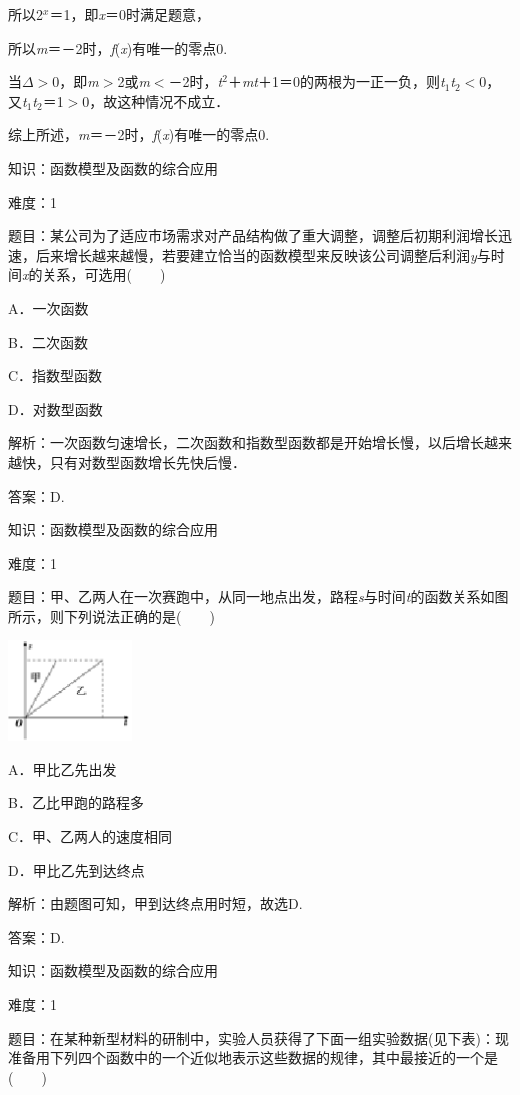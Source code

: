 \documentclass{article} %
\begin{document}
所以2\textit{${}^{x}$}＝1，即\textit{x}＝0时满足题意，

所以\textit{m}＝－2时，\textit{f}(\textit{x})有唯一的零点0.

当$\Delta$$\mathrm{>}$0，即\textit{m}$\mathrm{>}$2或\textit{m}$\mathrm{<}$－2时，\textit{t}${}^{2}$＋\textit{mt}＋1＝0的两根为一正一负，则\textit{t}${}_{1}$\textit{t}${}_{2}$$\mathrm{<}$0，又\textit{t}${}_{1}$\textit{t}${}_{2}$＝1$\mathrm{>}$0，故这种情况不成立．

综上所述，\textit{m}＝－2时，\textit{f}(\textit{x})有唯一的零点0.

知识：函数模型及函数的综合应用

难度：1

题目：某公司为了适应市场需求对产品结构做了重大调整，调整后初期利润增长迅速，后来增长越来越慢，若要建立恰当的函数模型来反映该公司调整后利润\textit{y}与时间\textit{x}的关系，可选用(　　)

A．一次函数　　　　 

B．二次函数

C．指数型函数   

D．对数型函数

解析：一次函数匀速增长，二次函数和指数型函数都是开始增长慢，以后增长越来越快，只有对数型函数增长先快后慢．

答案：D.

知识：函数模型及函数的综合应用

难度：1

题目：甲、乙两人在一次赛跑中，从同一地点出发，路程\textit{s}与时间\textit{t}的函数关系如图所示，则下列说法正确的是(　　)

\includegraphics*[width=1.29in, height=1.05in, keepaspectratio=false]{image74}

A．甲比乙先出发

B．乙比甲跑的路程多

C．甲、乙两人的速度相同

D．甲比乙先到达终点

解析：由题图可知，甲到达终点用时短，故选D.

答案：D.

知识：函数模型及函数的综合应用

难度：1

题目：在某种新型材料的研制中，实验人员获得了下面一组实验数据(见下表)：现准备用下列四个函数中的一个近似地表示这些数据的规律，其中最接近的一个是(　　)
\end{document}

